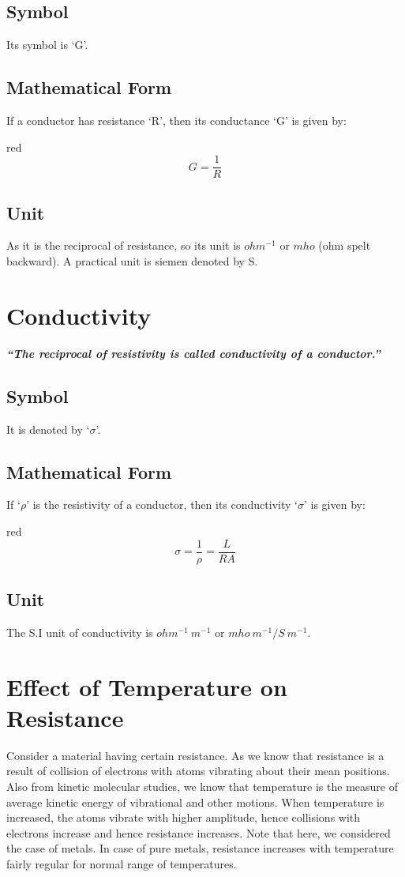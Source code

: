 \subsection*{Symbol}
Its symbol is ‘G’.
\subsection*{Mathematical Form}
If a conductor has resistance ‘R’, then its conductance ‘G’ is given by:
\begin{mybox}{red}{}
\begin{equation}\label{eq:12.8}
    G=\frac{1}{R}
\end{equation}
\end{mybox}
\subsection*{Unit}
As it is the reciprocal of resistance, so its unit is $ohm^{-1}$ or
$mho$ (ohm spelt backward). A practical unit is siemen denoted by S.
\section{Conductivity}
\textit{\textbf{``The reciprocal of resistivity is called conductivity of a conductor.”}}
\subsection*{Symbol}
It is denoted by ‘$\sigma$’.
\subsection*{Mathematical Form}
If ‘$\rho$’ is the resistivity of  a conductor, then its conductivity ‘$\sigma$’ is given by:
\begin{mybox}{red}{}
\begin{equation}
    \sigma = \frac{1}{\rho} = \frac{L}{RA}
\end{equation}
\end{mybox}
\subsection*{Unit}
The S.I unit of conductivity is $ohm^{-1}\:m^{-1}$ or $mho\:m^{-1}/S\:m^{-1}$.
\section{Effect of Temperature on Resistance}
Consider a material having certain resistance. As we  know that resistance is a result of collision of electrons with atoms vibrating about their mean positions. Also from kinetic molecular studies, we know that temperature is the measure of average kinetic energy of vibrational and other motions. When temperature is increased, the atoms vibrate with higher amplitude, hence collisions with electrons increase and hence resistance increases. Note that here, we considered the case of metals. In case of pure metals, resistance increases with temperature fairly regular for normal range of temperatures.
